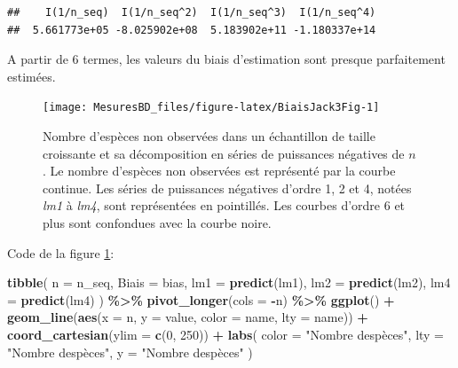 \documentclass[
  11pt,
  american,
  a4paper,
  extrafontsizes,onecolumn,openright
  ]{memoir}
\newenvironment{Shaded}{\begin{snugshade}}{\end{snugshade}}
\newcommand{\AttributeTok}[1]{\textcolor[rgb]{0.13,0.29,0.53}{#1}}
\newcommand{\DecValTok}[1]{\textcolor[rgb]{0.00,0.00,0.81}{#1}}
\newcommand{\FunctionTok}[1]{\textcolor[rgb]{0.13,0.29,0.53}{\textbf{#1}}}
\newcommand{\NormalTok}[1]{#1}
\newcommand{\SpecialCharTok}[1]{\textcolor[rgb]{0.81,0.36,0.00}{\textbf{#1}}}
\newcommand{\StringTok}[1]{\textcolor[rgb]{0.31,0.60,0.02}{#1}}
\newlength{\rf}
\begin{document}
\begin{verbatim}
##    I(1/n_seq)  I(1/n_seq^2)  I(1/n_seq^3)  I(1/n_seq^4) 
##  5.661773e+05 -8.025902e+08  5.183902e+11 -1.180337e+14
\end{verbatim}

\normalsize
A partir de 6 termes, les valeurs du biais d'estimation sont presque parfaitement estimées.



\scriptsize

\begin{figure}

{\centering \texttt{[image: MesuresBD\_files/figure-latex/BiaisJack3Fig-1]} 

}

\caption{Nombre d'espèces non observées dans un échantillon de taille croissante et sa décomposition en séries de puissances négatives de \(n\). Le nombre d'espèces non observées est représenté par la courbe continue. Les séries de puissances négatives d'ordre 1, 2 et 4, notées \emph{lm1} à \emph{lm4}, sont représentées en pointillés. Les courbes d'ordre 6 et plus sont confondues avec la courbe noire.}\label{fig:BiaisJack3Fig}
\end{figure}

\normalsize

Code de la figure \ref{fig:BiaisJack3Fig}:

\scriptsize

\begin{Shaded}
\begin{Highlighting}[]
\FunctionTok{tibble}\NormalTok{(}
  \AttributeTok{n =}\NormalTok{ n\_seq, }
  \AttributeTok{Biais =}\NormalTok{ bias, }
  \AttributeTok{lm1 =} \FunctionTok{predict}\NormalTok{(lm1),}
  \AttributeTok{lm2 =} \FunctionTok{predict}\NormalTok{(lm2), }
  \AttributeTok{lm4 =} \FunctionTok{predict}\NormalTok{(lm4)}
\NormalTok{) }\SpecialCharTok{\%\textgreater{}\%} 
  \FunctionTok{pivot\_longer}\NormalTok{(}\AttributeTok{cols =} \SpecialCharTok{{-}}\NormalTok{n) }\SpecialCharTok{\%\textgreater{}\%} 
  \FunctionTok{ggplot}\NormalTok{() }\SpecialCharTok{+}
    \FunctionTok{geom\_line}\NormalTok{(}\FunctionTok{aes}\NormalTok{(}\AttributeTok{x =}\NormalTok{ n, }\AttributeTok{y =}\NormalTok{ value, }\AttributeTok{color =}\NormalTok{ name, }\AttributeTok{lty =}\NormalTok{ name)) }\SpecialCharTok{+}
    \FunctionTok{coord\_cartesian}\NormalTok{(}\AttributeTok{ylim =} \FunctionTok{c}\NormalTok{(}\DecValTok{0}\NormalTok{, }\DecValTok{250}\NormalTok{)) }\SpecialCharTok{+}
    \FunctionTok{labs}\NormalTok{(}
      \AttributeTok{color =} \StringTok{"Nombre d\textquotesingle{}espèces"}\NormalTok{, }
      \AttributeTok{lty =} \StringTok{"Nombre d\textquotesingle{}espèces"}\NormalTok{,}
      \AttributeTok{y =} \StringTok{"Nombre d\textquotesingle{}espèces"}
\NormalTok{    )}
\end{Highlighting}
\end{Shaded}
\end{document}
